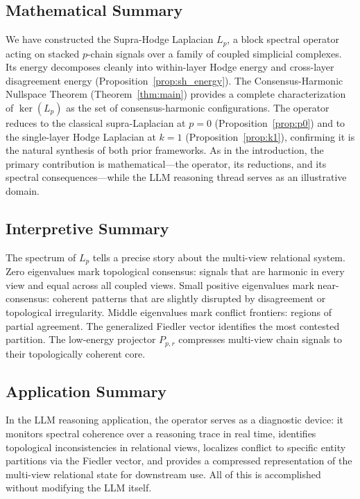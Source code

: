 \documentclass[11pt]{article}
\theoremstyle{definition}
\theoremstyle{remark}
\newcommand{\Pp}{P_{p,r}}
\begin{document}
\subsection{Mathematical Summary}

We have constructed the Supra-Hodge Laplacian $L_p$, a block spectral operator
acting on stacked $p$-chain signals over a family of coupled simplicial
complexes. Its energy decomposes cleanly into within-layer Hodge energy and
cross-layer disagreement energy (Proposition~\ref{prop:sh_energy}). The
Consensus-Harmonic Nullspace Theorem (Theorem~\ref{thm:main}) provides a
complete characterization of $\ker(L_p)$ as the set of consensus-harmonic
configurations. The operator reduces to the classical supra-Laplacian at $p=0$
(Proposition~\ref{prop:p0}) and to the single-layer Hodge Laplacian at $k=1$
(Proposition~\ref{prop:k1}), confirming it is the natural synthesis of both
prior frameworks. As in the introduction, the primary contribution is
mathematical---the operator, its reductions, and its spectral consequences---while
the LLM reasoning thread serves as an illustrative domain.

\subsection{Interpretive Summary}

The spectrum of $L_p$ tells a precise story about the multi-view relational
system. Zero eigenvalues mark topological consensus: signals that are harmonic
in every view and equal across all coupled views. Small positive eigenvalues
mark near-consensus: coherent patterns that are slightly disrupted by
disagreement or topological irregularity. Middle eigenvalues mark conflict
frontiers: regions of partial agreement. The generalized Fiedler vector
identifies the most contested partition. The low-energy projector $\Pp$
compresses multi-view chain signals to their topologically coherent core.

\subsection{Application Summary}

In the LLM reasoning application, the operator serves as a diagnostic device:
it monitors spectral coherence over a reasoning trace in real time, identifies
topological inconsistencies in relational views, localizes conflict to specific
entity partitions via the Fiedler vector, and provides a compressed
representation of the multi-view relational state for downstream use. All of
this is accomplished without modifying the LLM itself.
\end{document}
